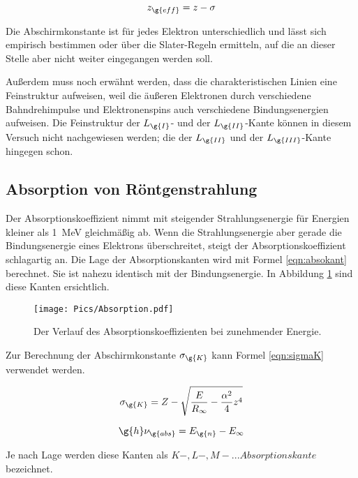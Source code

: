 \begin{equation}
  z_{\g{eff}} = z - \sigma
  \label{eqn:zeff}
\end{equation}

Die Abschirmkonstante ist für jedes Elektron unterschiedlich und lässt sich empirisch
bestimmen oder über die Slater-Regeln ermitteln, auf die an dieser Stelle aber nicht
weiter eingegangen werden soll.

Außerdem muss noch erwähnt werden, dass die charakteristischen Linien eine Feinstruktur
aufweisen, weil die äußeren Elektronen durch verschiedene Bahndrehimpulse und Elektronenspins
auch verschiedene Bindungsenergien aufweisen. Die Feinstruktur der $L_{\g{I}}$- und der
$L_{\g{II}}$-Kante können in diesem Versuch nicht nachgewiesen werden; die der $L_{\g{II}}$
und der $L_{\g{III}}$-Kante hingegen schon.

\subsection{Absorption von Röntgenstrahlung}

Der Absorptionskoeffizient nimmt mit steigender Strahlungsenergie für Energien
kleiner als \SI{1}{\mega\electronvolt} gleichmäßig ab. Wenn die
Strahlungsenergie aber gerade die Bindungsenergie eines Elektrons überschreitet, steigt der
Absorptionskoeffizient schlagartig an.
Die Lage der Absorptionskanten wird mit Formel \eqref{eqn:absokant} berechnet. Sie ist nahezu
identisch mit der Bindungsenergie. In Abbildung \ref{fig:absokant} sind diese Kanten
ersichtlich.

\begin{figure}
  \centering
  \texttt{[image: Pics/Absorption.pdf]}
  \caption{Der Verlauf des Absorptionskoeffizienten bei zunehmender Energie. \cite{anleitung}}
  \label{fig:absokant}
\end{figure}

Zur Berechnung der Abschirmkonstante $\sigma_{\g{K}}$ kann Formel \eqref{eqn:sigmaK}
verwendet werden.

\begin{align}
  \sigma_{\g{K}} = Z - \sqrt{\frac{E}{R_\infty}- \frac{\alpha^2}{4}z^4}
  \label{eqn:sigmaK}
\end{align}

\begin{equation}
  \g{h} \nu_{\g{abs}} = E_{\g{n}} - E_{\infty}
  \label{eqn:absokant}
\end{equation}

Je nach Lage werden diese Kanten als $K-,L-,M-...Absorptionskante$ bezeichnet.

